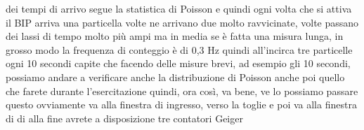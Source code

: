 {dei tempi di arrivo segue la statistica di Poisson e quindi ogni volta che si attiva il BIP arriva una particella volte ne arrivano due molto ravvicinate, volte passano dei lassi di tempo molto più ampi ma in media se è fatta una misura lunga, in grosso modo la frequenza di conteggio è di 0,3 Hz quindi all'incirca tre particelle ogni 10 secondi capite che facendo delle misure brevi, ad esempio gli 10 secondi, possiamo andare a verificare anche la distribuzione di Poisson anche poi quello che farete durante l'esercitazione quindi, ora così, va bene, ve lo possiamo passare questo ovviamente va alla finestra di ingresso, verso la toglie e poi va alla finestra di di alla fine avrete a disposizione tre contatori Geiger
}
